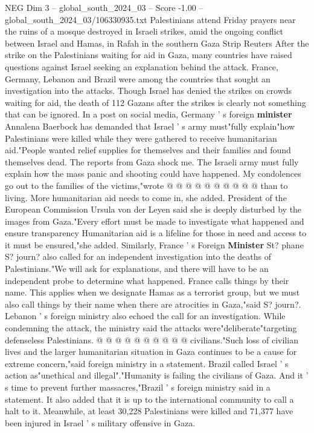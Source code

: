 \begin{textsample}{NEG Dim 3 – global\_south\_2024\_03 – Score -1.00 – global\_south\_2024\_03/106330935.txt}  \label{ex:f3_neg_043}
Palestinians attend Friday prayers near the ruins of a mosque destroyed in Israeli strikes, amid the ongoing conflict between Israel and Hamas, in Rafah in the southern Gaza Strip Reuters After the strike on the Palestinians waiting for aid in Gaza, many countries have raised questions against Israel seeking an explanation behind the attack.
France, Germany, Lebanon and Brazil were among the countries that sought an investigation into the attacks.
Though Israel has denied the strikes on crowds waiting for aid, the death of 112 Gazans after the strikes is clearly not something that can be ignored.
In a post on social media, Germany ' s foreign \textbf{minister} Annalena Baerbock has demanded that Israel ' s army must"fully explain"how Palestinians were killed while they were gathered to receive humanitarian aid."People wanted relief supplies for themselves and their families and found themselves dead.
The reports from Gaza shock me.
The Israeli army must fully explain how the mass panic and shooting could have happened.
My condolences go out to the families of the victims,"wrote @ @ @ @ @ @ @ @ @ @ than to living.
More humanitarian aid needs to come in, she added.
President of the European Commission Ursula von der Leyen said she is deeply disturbed by the images from Gaza."Every effort must be made to investigate what happened and ensure transparency Humanitarian aid is a lifeline for those in need and access to it must be ensured,"she added.
Similarly, France ' s Foreign \textbf{Minister} St? phane S? journ? also called for an independent investigation into the deaths of Palestinians."We will ask for explanations, and there will have to be an independent probe to determine what happened.
France calls things by their name.
This applies when we designate Hamas as a terrorist group, but we must also call things by their name when there are atrocities in Gaza,"said S? journ?.
Lebanon ' s foreign ministry also echoed the call for an investigation.
While condemning the attack, the ministry said the attacks were"deliberate"targeting defenseless Palestinians. @ @ @ @ @ @ @ @ @ @ civilians."Such loss of civilian lives and the larger humanitarian situation in Gaza continues to be a cause for extreme concern,"said foreign ministry in a statement.
Brazil called Israel ' s action as"unethical and illegal"."Humanity is failing the civilians of Gaza.
And it ' s time to prevent further massacres,"Brazil ' s foreign ministry said in a statement.
It also added that it is up to the international community to call a halt to it.
Meanwhile, at least 30,228 Palestinians were killed and 71,377 have been injured in Israel ' s military offensive in Gaza.

\end{textsample}
